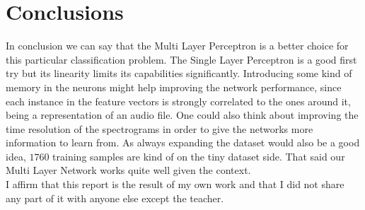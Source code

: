 \documentclass[10pt,a4paper]{report}
\begin{document}
\section{Conclusions}
In conclusion we can say that the Multi Layer Perceptron is a better choice for this particular classification problem. The Single Layer Perceptron is a good first try but its linearity limits its capabilities significantly. Introducing some kind of memory in the neurons might help improving the network performance, since each instance in the feature vectors is strongly correlated to the ones around it, being a representation of an audio file. One could also think about improving the time resolution of the spectrograms in order to give the networks more information to learn from. As always expanding the dataset would also be a good idea, $1760$ training samples are kind of on the tiny dataset side. That said our Multi Layer Network works quite well given the context.
\vspace*{\fill}
\\
I affirm that this report is the result of my own work and that I did not share any part of it with anyone else except the teacher.
\\ \\ 
\end{document}
